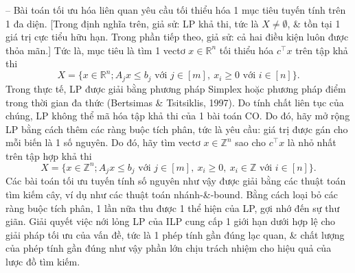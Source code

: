 \documentclass{article}
\begin{document}
\begin{itemize}
\begin{itemize}
\begin{itemize}
            -- Bài toán tối ưu hóa liên quan yêu cầu tối thiểu hóa 1 mục tiêu tuyến tính trên 1 đa diện. [Trong định nghĩa trên, giả sử: LP khả thi, tức là $X\ne\emptyset$, \& tồn tại 1 giá trị cực tiểu hữu hạn. Trong phần tiếp theo, giả sử: cả hai điều kiện luôn được thỏa mãn.] Tức là, mục tiêu là tìm 1 vectơ $x\in\mathbb{R}^n$ tối thiểu hóa $c^\top x$ trên tập khả thi
            \begin{equation*}
                X = \{x\in\mathbb{R}^n;A_jx\le b_j\mbox{ với } j\in[m],\ x_i\ge0\mbox{ với } i\in[n]\}.
            \end{equation*}
            Trong thực tế, LP được giải bằng phương pháp Simplex hoặc phương pháp điểm trong thời gian đa thức (Bertsimas \& Tsitsiklis, 1997). Do tính chất liên tục của chúng, LP không thể mã hóa tập khả thi của 1 bài toán CO. Do đó, hãy mở rộng LP bằng cách thêm các ràng buộc tích phân, tức là yêu cầu: giá trị được gán cho mỗi biến là 1 số nguyên. Do đó, hãy tìm vectơ $x\in\mathbb{Z}^n$ sao cho $c^\top x$ là nhỏ nhất trên tập hợp khả thi
            \begin{equation*}
                X = \{x\in\mathbb{Z}^n;A_jx\le b_j\mbox{ với } j\in[m],\ x_i\ge0,\ x_i\in\mathbb{Z}\mbox{ với } i\in[n]\}.
            \end{equation*}
            Các bài toán tối ưu tuyến tính số nguyên như vậy được giải bằng các thuật toán tìm kiếm cây, ví dụ như các thuật toán nhánh-\&-bound. Bằng cách loại bỏ các ràng buộc tích phân, 1 lần nữa thu được 1 thể hiện của LP, gợi nhớ đến sự thư giãn. Giải quyết việc nới lỏng LP của ILP cung cấp 1 giới hạn dưới hợp lệ cho giải pháp tối ưu của vấn đề, tức là 1 phép tính gần đúng lạc quan, \& chất lượng của phép tính gần đúng như vậy phần lớn chịu trách nhiệm cho hiệu quả của lược đồ tìm kiếm.


\end{itemize}
\end{itemize}
\end{itemize}
\end{document}
